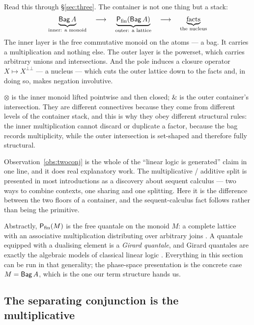 Read this through \S\ref{sec:three}. The container is not one thing but a stack:
\[
  \underbrace{\mathsf{Bag}\,A}_{\text{inner: a monoid}}
  \quad\longrightarrow\quad
  \underbrace{\mathsf{P}_{\mathrm{fin}}(\mathsf{Bag}\,A)}_{\text{outer: a lattice}}
  \quad\longrightarrow\quad
  \underbrace{\text{facts}}_{\text{the nucleus}}
\]
The inner layer is the free commutative monoid on the atoms --- a bag. It carries
a multiplication and nothing else. The outer layer is the powerset, which carries
arbitrary unions and intersections. And the pole induces a closure operator
$X \mapsto X^{\bot\bot}$ --- a nucleus --- which cuts the outer lattice down to
the facts and, in doing so, makes negation involutive.

\begin{observation}
\label{obs:twoconj}
$\otimes$ is the inner monoid lifted pointwise and then closed; $\&$ is the outer
container's intersection. They are different connectives because they come from
different levels of the container stack, and this is why they obey different
structural rules: the inner multiplication cannot discard or duplicate a factor,
because the bag records multiplicity, while the outer intersection is set-shaped
and therefore fully structural.
\end{observation}

Observation~\ref{obs:twoconj} is the whole of the ``linear logic is generated''
claim in one line, and it does real explanatory work. The multiplicative /
additive split is presented in most introductions as a discovery about sequent
calculus --- two ways to combine contexts, one sharing and one splitting. Here it
is the difference between the two floors of a container, and the sequent-calculus
fact follows rather than being the primitive.

\begin{remark}[Quantales]
\label{rem:quantale}
Abstractly, $\mathsf{P}_{\mathrm{fin}}(M)$ is the free quantale on the monoid $M$: a complete lattice
with an associative multiplication distributing over arbitrary joins
\cite{Rosenthal90}. A quantale equipped with a dualising element is a
\emph{Girard quantale}, and Girard quantales are exactly the algebraic models of
classical linear logic \cite{Yetter90}. Everything in this section can be run in
that generality; the phase-space presentation is the concrete case
$M = \mathsf{Bag}\,A$, which is the one our term structure hands us.
\end{remark}

\subsection{The separating conjunction is the multiplicative}

